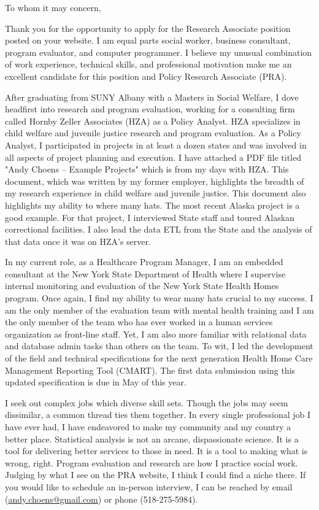 \documentclass{letter}
\begin{document}
\begin{letter}{}

\opening{To whom it may concern,}

Thank you for the opportunity to apply for the Research Associate
position posted on your website. I am equal parts social worker,
business consultant, program evaluator, and computer programmer. I
believe my unusual combination of work experience, technical skills,
and professional motivation make me an excellent candidate for this
position and Policy Research Associate (PRA).

After graduating from SUNY Albany with a Masters in Social Welfare, I
dove headfirst into research and program evaluation, working for a
consulting firm called Hornby Zeller Associates (HZA) as a Policy
Analyst. HZA specializes in child welfare and juvenile justice
research and program evaluation. As a Policy Analyst, I participated
in projects in at least a dozen states and was involved in all aspects
of project planning and execution. I have attached a PDF file titled
"Andy Choens – Example Projects" which is from my days with HZA. This
document, which was written by my former employer, highlights the
breadth of my research experience in child welfare and juvenile
justice. This document also highlights my ability to where many hats. The
most recent Alaska project is a good example. For that project, I
interviewed State staff and toured Alaskan correctional facilities. I
also lead the data ETL from the State and the analysis of that data
once it was on HZA's server.

In my current role, as a Healthcare Program Manager, I am an embedded
consultant at the New York State Department of Health where I
supervise internal monitoring and evaluation of the New York State
Health Homes program. Once again, I find my ability to wear many hats
crucial to my success. I am the only member of the evaluation team
with mental health training and I am the only member of the team who
has ever worked in a human services organization as front-line
staff. Yet, I am also more familiar with relational data and database
admin tasks than others on the team. To wit, I led the development of
the field and technical specifications for the next generation Health
Home Care Management Reporting Tool (CMART). The first data submission
using this updated specification is due in May of this year.

I seek out complex jobs which diverse skill sets. Though the jobs may
seem dissimilar, a common thread ties them together. In every single
professional job I have ever had, I have endeavored to make my
community and my country a better place. Statistical analysis is not
an arcane, dispassionate science.  It is a tool for delivering better
services to those in need. It is a tool to making what is wrong,
right. Program evaluation and research are how I practice social
work. Judging by what I see on the PRA website, I think I could find a
niche there. If you would like to schedule an in-person interview, I
can be reached by email (\underline{andy.choens@gmail.com}) or phone
(518-275-5984).


\end{letter}
\end{document}
